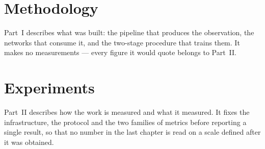 \documentclass[english, LaM, oneside, noexaminfo]{uaqthesis}
\begin{document}
\frontmatter





\tableofcontents
\listoffigures
\listoftables

\mainmatter




\part{Methodology}
Part~I describes what was built: the pipeline that produces the observation, the
networks that consume it, and the two-stage procedure that trains them. It makes
no measurements --- every figure it would quote belongs to Part~II.




\part{Experiments}
Part~II describes how the work is measured and what it measured. It fixes the
infrastructure, the protocol and the two families of metrics before reporting a
single result, so that no number in the last chapter is read on a scale defined
after it was obtained.





\begin{appendices}

\end{appendices}

\backmatter
\printbibliography[heading=bibintoc]
\end{document}
